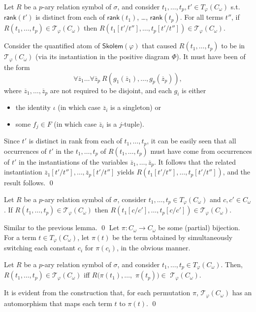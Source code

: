 \documentclass{LMCS}
\newcommand{\rank}[0]{\ensuremath{\mathsf{rank}}}
\newcommand{\skolem}[0]{\ensuremath{\mathsf{Skolem}}}
\begin{document}
\begin{lem}
\label{lem:sub-terms}
Let $R$ be a $p$-ary relation symbol of $\sigma$, and consider $t_1,\ldots,t_p,t' \in T_\varphi(C_\omega)$ s.t. $\rank(t')$ is distinct from each of $\rank(t_1)$, \ldots, $\rank(t_p)$. For all terms $t''$, if $R(t_1,\ldots,t_p) \in \mathcal{T}_\varphi(C_\omega)$ then $R(t_1[t'/t''],\ldots,t_p[t'/t'']) \in \mathcal{T}_\varphi(C_\omega)$.
\end{lem}
\proof
Consider the quantified atom of $\skolem(\varphi)$ that caused $R(t_1,\ldots,t_p)$ to be in $\mathcal{T}_\varphi(C_\omega)$ (via its instantiation in the positive diagram $\Phi$). It must have been of the form
\[ \forall \overline{z}_1 \ldots \forall \overline{z}_p \ R(g_1(\overline{z}_1),\ldots,g_p(\overline{z}_p)), \]
where $\overline{z}_1, \ldots, \overline{z}_p$ are not required to be disjoint, and each $g_i$ is either
\begin{itemize}
\item the identity $\iota$ (in which case $\overline{z}_i$ is a singleton) or 
\item some $f_j \in F$ (in which case $\overline{z}_i$ is a $j$-tuple).
\end{itemize}
Since $t'$ is distinct in rank from each of $t_1,\ldots,t_p$, it can be easily seen that all occurrences of $t'$ in the $t_1,\ldots,t_p$ of  $R(t_1,\ldots,t_p)$ must have come from occurrences of $t'$ in the instantiations of the variables $\overline{z}_1, \ldots, \overline{z}_p$. It follows that the related instantiation $\overline{z}_1[t'/t''], \ldots, \overline{z}_p[t'/t'']$ yields $R(t_1[t'/t''],\ldots,t_p[t'/t''])$, and the result follows.
\qed

\begin{lem}
\label{lem:sub-consts}
Let $R$ be a $p$-ary relation symbol of $\sigma$, consider $t_1,\ldots,t_p \in T_\varphi(C_\omega)$ and $c,c' \in C_\omega$. If $R(t_1,\ldots,t_p) \in \mathcal{T}_\varphi(C_\omega)$ then $R(t_1[c/c'],\ldots,t_p[c/c']) \in \mathcal{T}_\varphi(C_\omega)$.
\end{lem}
\proof
Similar to the previous lemma.
\qed
Let $\pi:C_\omega \rightarrow C_\omega$ be some (partial) bijection. For a term $t \in T_\varphi(C_\omega)$, let $\pi(t)$ be the term obtained by simultaneously switching each constant $c_i$ for $\pi(c_i)$, in the obvious manner.
\begin{lem}
\label{lem:aut}
Let $R$ be a $p$-ary relation symbol of $\sigma$, and consider $t_1,\ldots,t_p \in T_\varphi(C_\omega)$.
Then, $R(t_1,\ldots,t_p) \in \mathcal{T}_\varphi(C_\omega)$ iff $R(\pi(t_1),\ldots,$ $\pi(t_p)) \in$ $\mathcal{T}_\varphi(C_\omega)$.
\end{lem}
\proof
It is evident from the construction that, for each permutation $\pi$, $\mathcal{T}_\varphi(C_\omega)$ has an automorphism that maps each term $t$ to $\pi(t)$.
\qed
\end{document}
